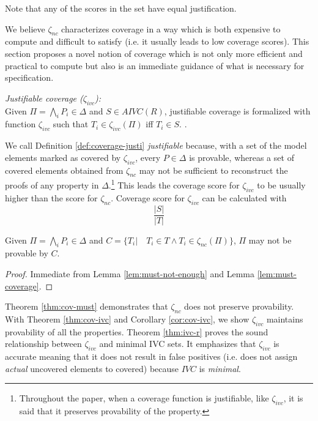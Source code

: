 \noindent Note that any of the scores in the set have equal justification.

%

We believe $\zeta_{nc}$ characterizes coverage in a way which is both expensive to compute and difficult to satisfy (i.e. it usually leads to low coverage scores). This section proposes a novel notion of coverage which is not only more efficient and practical to compute but also is an immediate guidance of what is necessary for specification.

\begin{definition} {\emph{Justifiable coverage ($\zeta_{ivc}$):}} \\
  \label{def:coverage-justi}
Given $\Pi = \bigwedge_{i} {P_i \in \Delta}$ and $S \in AIVC(R)$, justifiable coverage is formalized with function $\zeta_{ivc}$ such that $T_i \in \zeta_{ivc}(\Pi)$ iff  $T_i \in S$. .
\end{definition}
\vspace{2mm}

%
We call Definition \ref{def:coverage-justi} \emph{justifiable} because, with a set of the model elements marked as covered by $\zeta_{ivc}$, every $P \in \Delta$ is provable, whereas a set of covered elements obtained from $\zeta_{nc}$ may not be sufficient to reconstruct the proofs of any property in $\Delta$.\footnote{Throughout the paper, when a coverage function is justifiable, like $\zeta_{ivc}$, it is said that it preserves provability of the property.}
This leads the coverage score for $\zeta_{ivc}$ to be usually higher than the score for $\zeta_{nc}$. Coverage score for $\zeta_{ivc}$ can be calculated with $$\frac{|S|}{|T|}$$

\begin{theorem}
\label{thm:cov-must}
Given $\Pi = \bigwedge_{i} {P_i \in \Delta}$ and
$C = \{T_i |\quad T_i \in T \wedge T_i \in \zeta_{nc}(\Pi)\}$,
$\Pi$ may not be provable by $C$.
\end{theorem}
\begin{proof}
Immediate from Lemma \ref{lem:must-not-enough} and Lemma \ref{lem:must-coverage}.
\end{proof}
\vspace{2mm}
Theorem \ref{thm:cov-must} demonstrates that $\zeta_{nc}$ does not preserve provability.
With Theorem \ref{thm:cov-ivc} and Corollary \ref{cor:cov-ivc},
we show $\zeta_{ivc}$ maintains provability of all the properties.
Theorem \ref{thm:ivc-r} proves the sound relationship
between $\zeta_{ivc}$ and minimal IVC sets.
It emphasizes that $\zeta_{ivc}$ is accurate meaning that it does not result in false positives
(i.e. does not assign \emph{actual} uncovered elements to covered) because $IVC$ is \emph{minimal}.

